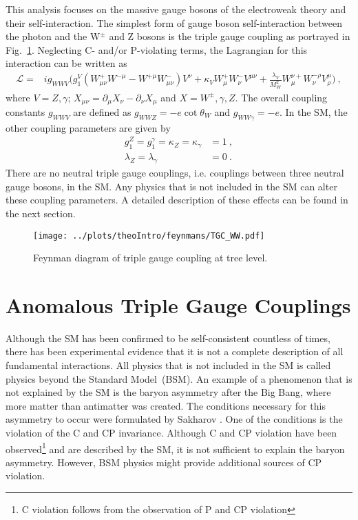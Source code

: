 \noindent This analysis focuses on the massive gauge bosons of the electroweak theory and their self-interaction. The simplest form of gauge boson self-interaction between  the photon and the W$^\pm$ and Z bosons is the triple gauge coupling as portrayed in Fig.~\ref{fig:theo:tgc}. Neglecting C- and/or P-violating terms, the Lagrangian for this interaction can be written as \cite{EFT}
\begin{align}
\mathcal{L} =& ig_{WWV}\Big( g_1^V(W_{\mu\nu}^+W^{-\mu} - W^{+\mu}W_{\mu\nu}^-)V^{\nu} + \kappa_VW_\mu^+W_\nu^-V^{\mu\nu}  + \frac{\lambda_V}{M_W^2}W_\mu^{\nu+}W_\nu^{-\rho}V_\rho^\mu  \Big) ~, \label{eq:theo:EWKlag}
\end{align}
where $V=Z,\gamma$; $X_{\mu\nu}=\partial_\mu X_\nu -\partial_\nu X_\mu$ and $X=W^\pm,\gamma ,Z$. The overall coupling constants $g_{WWV}$ are defined as $g_{WWZ} = -e \cot \theta_W$ and $g_{WW\gamma} =-e$. In the SM, the other coupling parameters are given by
\begin{align}
g_1^Z = g_1^\gamma = \kappa_Z = \kappa_\gamma &= 1 ~, \\
\lambda_Z = \lambda_\gamma &= 0 ~.
\end{align}
There are no neutral triple gauge couplings, i.e. couplings between three neutral gauge bosons, in the SM. Any physics that is not included in the SM can alter these coupling parameters. A detailed description of these effects can be found in the next section.
\begin{figure}
	\centering
	\texttt{[image: ../plots/theoIntro/feynmans/TGC\_WW.pdf]}
	\caption[Feynman diagram of triple gauge coupling at tree level]{Feynman diagram of triple gauge coupling at tree level.}
	\label{fig:theo:tgc}
\end{figure}

\section{Anomalous Triple Gauge Couplings}
\label{sec:aTGC}
Although the SM has been confirmed to be self-consistent countless of times, there has been experimental evidence that it is not a complete description of all fundamental interactions. All physics that is not included in the SM is called physics beyond the Standard Model~(BSM). An example of a phenomenon that is not explained by the SM is the baryon asymmetry after the Big Bang, where more matter than antimatter was created. The conditions necessary for this asymmetry to occur were formulated by Sakharov \cite{sakharov}. One of the conditions is the violation of the C and CP invariance. Although C and CP violation have been observed\footnote{C violation follows from the observation of P \cite{wu} and CP violation}\cite{CP} and are described by the SM, it is not sufficient to explain the baryon asymmetry. However, BSM physics might provide additional sources of CP violation.\\

